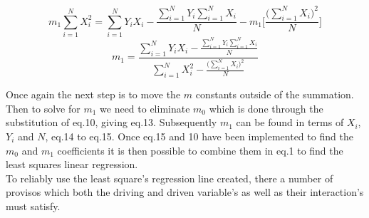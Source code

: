 \documentclass[11pt]{article}
\begin{document}
\begin{figure}
\begin{equation}
m_1\sum\limits_{i=1}^N X_i^2 = \sum\limits_{i=1}^N Y_iX_i - \frac{\sum\limits_{i=1}^N Y_i \sum\limits_{i=1}^NX_i}{N} - m_1\Bigg[\frac{\bigg(\sum\limits_{i=1}^NX_i\bigg)^2}{N}\Bigg]
\end{equation}
\begin{equation}
m_1 = \frac{\sum\limits_{i=1}^N Y_iX_i - \frac{\sum\limits_{i=1}^N Y_i \sum\limits_{i=1}^NX_i}{N}} {\sum\limits_{i=1}^NX_i^2-\frac{\bigg(\sum\limits_{i=1}^NX_i\bigg)^2}{N}}
\end{equation}
\end{figure} 
Once again the next step is to move the $m$ constants outside of the summation. Then to solve for $m_1$ we need to eliminate $m_0$ which is done through the substitution of eq.10, giving eq.13. Subsequently $m_1$ can be found in terms of $X_i$, $Y_i$ and $N$, eq.14 to eq.15. Once eq.15 and 10 have been implemented to find the $m_0$ and $m_1$ coefficients it is then possible to combine them in eq.1 to find the least squares linear regression. 
\\ \indent 
To reliably use the least square's regression line created, there a number of provisos which both the driving and driven variable's as well as their interaction's must satisfy. 
\end{document}
